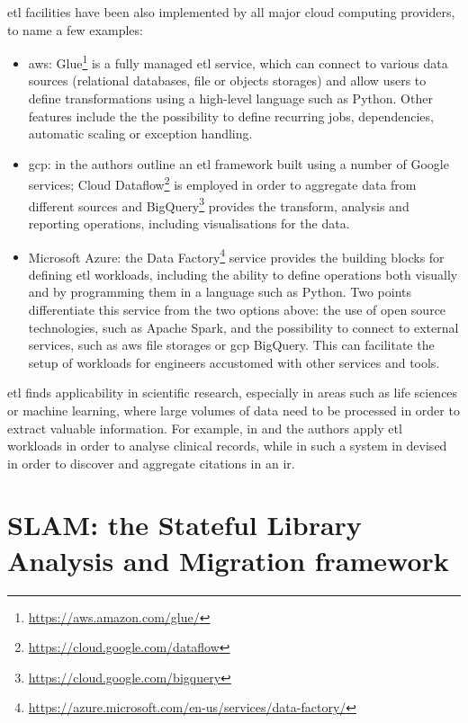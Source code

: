 \gls{etl} facilities have been also implemented by all major cloud computing providers, to name a few examples:
\begin{itemize}
    \item \gls{aws}: Glue\footnote{\url{https://aws.amazon.com/glue/}} is a fully managed \gls{etl} service, which can connect to various data sources (relational databases, file or objects storages) and allow users to define transformations using a high-level language such as Python. Other features include the the possibility to define recurring jobs, dependencies, automatic scaling or exception handling. 
    
    \item \gls{gcp}: in \cite{gcp} the authors outline an \gls{etl} framework built using a number of Google services; Cloud Dataflow\footnote{\url{https://cloud.google.com/dataflow}} is employed in order to aggregate data from different sources and BigQuery\footnote{\url{https://cloud.google.com/bigquery}} provides the transform, analysis and reporting operations, including visualisations for the data.
    
    \item Microsoft Azure: the Data Factory\footnote{\url{https://azure.microsoft.com/en-us/services/data-factory/}} service provides the building blocks for defining \gls{etl} workloads, including the ability to define operations both visually and by programming them in a language such as Python. Two points differentiate this service from the two options above: the use of open source technologies, such as Apache Spark, and the possibility to connect to external services, such as \gls{aws} file storages or \gls{gcp} BigQuery. This can facilitate the setup of workloads for engineers accustomed with other services and tools.
\end{itemize}

\gls{etl} finds applicability in scientific research, especially in areas such as life sciences or machine learning, where large volumes of data need to be processed in order to extract valuable information. For example, in \cite{denney} and \cite{godihno} the authors apply \gls{etl} workloads in order to analyse clinical records, while in \cite{ferreira} such a system in devised in order to discover and aggregate citations in an \gls{ir}.

\section{SLAM: the Stateful  Library  Analysis  and  Migration framework}
\label{sec:slam}

